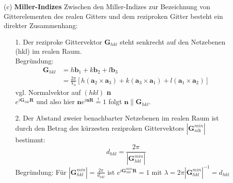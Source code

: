 \begin{itemize}
\begin{itemize}
          \end{itemize}
    \item[(c)] \textbf{Miller-Indizes}
          Zwischen den Miller-Indizes zur Bezeichnung von Gitterelementen des realen Gitters und dem reziproken Gitter besteht ein direkter Zusammenhang:\\
          \begin{itemize}
              \item[1.] Der reziproke Gittervektor $\textbf{G}_{hkl}$ steht senkrecht auf den Netzebenen (hkl) im realen Raum.\\
                    Begründung:
                    \begin{align*}
                        \textbf{G}_{hkl} & = h \textbf{b}_1 + k \textbf{b}_2 + l \textbf{b}_3\\
                        & =\frac{2 \pi}{V_0}\left[h(\textbf{a}_2\times \textbf{a}_3) + k(\textbf{a}_3\times \textbf{a}_1) + l(\textbf{a}_1\times \textbf{a}_2)\right]
                    \end{align*}
                    vgl. Normalvektor auf $(hkl)$ \textbf{n}\\
                    $e^{i \textbf{G}_{hkl}\textbf{R}}$ und also hier $\textbf{n} e^{i \textbf{n} \textbf{R}} \overset{!}{=}1$ folgt $\textbf{n} \parallel \textbf{G}_{hkl}$.
              \item[2.] Der Abstand zweier benachbarter Netzebenen im realen Raum ist durch den Betrag des kürzesten reziproken Gittervektors $\left| \textbf{G}_{nlk}^{min} \right|$ bestimmt:
              $$d_{hkl} = \frac{2 \pi}{\left| \textbf{G}_{hkl}^{min} \right|} $$
              Begründung: Für $\left| \textbf{G}_{hkl}^{min} \right| = \frac{2 \pi}{d_{hkl}}$ ist $e^{i \textbf{G}_{hkl}^{min} \textbf{R}} = 1$ mit $\lambda = 2 \pi \left| \textbf{G}_{hkl}^{min} \right|^{-1} = d_{hkl}$
          \end{itemize}
\end{itemize}



